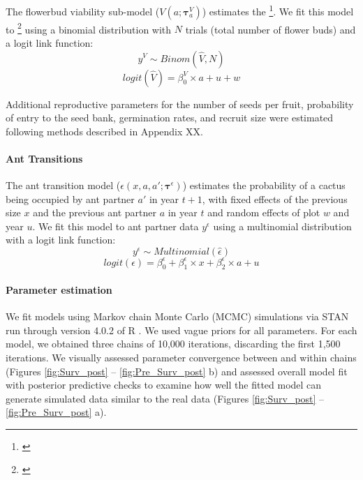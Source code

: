 \documentclass[11pt]{article}
\newcommand{\tom}[2]{{\color{red}{#1}}\footnote{\textit{\color{red}{#2}}}}
\begin{document}
The flowerbud viability sub-model ($V(a;\pmb{\tau}^{V}_{a})$) estimates the \tom{proportion of flowers produced by a plant that are viable (not aborted) in year $t+1$, with fixed effects of ant partner $a$ in year $t$}{The way this is written here is not correct. Viability in year t should be a function of ants in year t. I would double check that this is what the model is actually doing.}.
We fit this model to \tom{floral abortion data $y^V$}{The way this is written it's unclear whether you are modeling probability of viability or probability of abortion} using a binomial distribution with $N$ trials (total number of flower buds) and a logit link function:
$$y^{V} \sim Binom(\hat{V},N)$$
$$logit(\hat{V}) = \beta_{0}^{V} \times a + u + w$$

Additional reproductive parameters for the number of seeds per fruit, probability of entry to the seed bank, germination rates, and recruit size were estimated following methods described in Appendix XX.

\paragraph{Ant Transitions}
The ant transition model ($\epsilon(x,a,a';\pmb{\tau}^{\epsilon})$) estimates the probability of a cactus being occupied by ant partner $a'$ in year $t+1$, with fixed effects of the previous size $x$  and the previous ant partner $a$  in year $t$ and random effects of plot $w$ and year $u$.
We fit this model to ant partner data $y^{\epsilon}$ using a multinomial distribution with a logit link function: 
$$y^{\epsilon} \sim Multinomial(\hat{\epsilon})$$
$$logit(\epsilon) = \beta_{0}^{\epsilon} + \beta_{1}^{\epsilon} \times x + \beta_{2}^{\epsilon} \times a + u$$

\paragraph{Parameter estimation}
We fit models using Markov chain Monte Carlo (MCMC) simulations via STAN run through version 4.0.2 of R \cite{Rcite,Rstancite}. 
We used vague priors for all parameters. 
For each model, we obtained three chains of 10,000 iterations, discarding the first 1,500 iterations. 
We visually assessed parameter convergence between and within chains (Figures \ref{fig:Surv_post} -- \ref{fig:Pre_Surv_post} b) and assessed overall model fit with posterior predictive checks to examine how well the fitted model can generate simulated data similar to the real data (Figures \ref{fig:Surv_post} -- \ref{fig:Pre_Surv_post} a).
\end{document}
